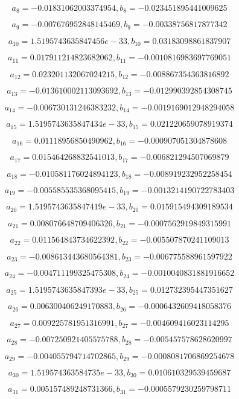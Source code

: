 \documentclass[12pt]{article}
\begin{document}
$$a_{ 8 } = -0.01831062003374954 , b_{ 8 } = -0.023451895441009625$$

$$a_{ 9 } = -0.007676952848145469 , b_{ 9 } = -0.00338756817877342$$

$$a_{ 10 } = 1.5195743635847456e-33 , b_{ 10 } = 0.03183098861837907$$

$$a_{ 11 } = 0.017911214823682062 , b_{ 11 } = -0.0010816983697769051$$

$$a_{ 12 } = 0.023201132067024215 , b_{ 12 } = -0.008867354363816892$$

$$a_{ 13 } = -0.013610002113093692 , b_{ 13 } = -0.012990392854308745$$

$$a_{ 14 } = -0.006730131246383232 , b_{ 14 } = -0.0019169012948294058$$

$$a_{ 15 } = 1.5195743635847434e-33 , b_{ 15 } = 0.021220659078919374$$

$$a_{ 16 } = 0.01118956850490962 , b_{ 16 } = -0.000907051304878608$$

$$a_{ 17 } = 0.015464268832541013 , b_{ 17 } = -0.006821294507069879$$

$$a_{ 18 } = -0.010581176024894123 , b_{ 18 } = -0.008919232952258454$$

$$a_{ 19 } = -0.005585535368095415 , b_{ 19 } = -0.0013214190722783403$$

$$a_{ 20 } = 1.5195743635847419e-33 , b_{ 20 } = 0.015915494309189534$$

$$a_{ 21 } = 0.008076648709406326 , b_{ 21 } = -0.0007562919849315991$$

$$a_{ 22 } = 0.011564843734622392 , b_{ 22 } = -0.005507870241109013$$

$$a_{ 23 } = -0.008613443680564381 , b_{ 23 } = -0.006775588961597922$$

$$a_{ 24 } = -0.004711199325475308 , b_{ 24 } = -0.0010040831881916652$$

$$a_{ 25 } = 1.5195743635847393e-33 , b_{ 25 } = 0.012732395447351627$$

$$a_{ 26 } = 0.006300406249170883 , b_{ 26 } = -0.0006432609418058376$$

$$a_{ 27 } = 0.009225781951316991 , b_{ 27 } = -0.004609416023114295$$

$$a_{ 28 } = -0.007250921405575788 , b_{ 28 } = -0.005457578628620997$$

$$a_{ 29 } = -0.004055794714702865 , b_{ 29 } = -0.0008081706869254678$$

$$a_{ 30 } = 1.519574363584735e-33 , b_{ 30 } = 0.010610329539459687$$

$$a_{ 31 } = 0.005157489248731366 , b_{ 31 } = -0.0005579230259798711$$
\end{document}
